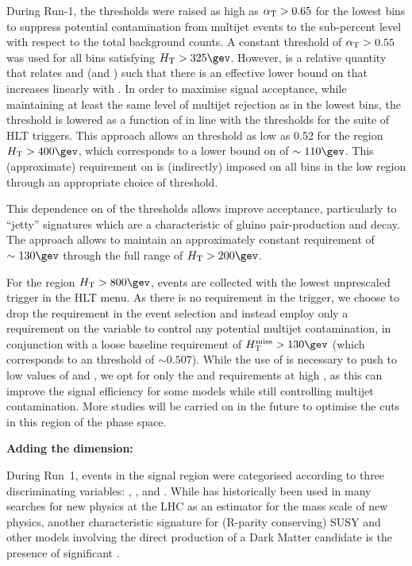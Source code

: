 During Run-1, the \alphat thresholds were raised as high as $\alpha_{\text{T}} >
0.65$ for the lowest \scalht bins to suppress potential contamination
from multijet events to the sub-percent level with respect to the
total background counts. A constant threshold of $\alpha_{\text{T}} > 0.55$ was
used for all bins satisfying $\scalht > 325\gev$. However, \alphat is
a relative quantity that relates \scalht and \mht (and \dht) such that
there is an effective lower bound on \mht that increases linearly with
\scalht. In order to maximise signal acceptance, while maintaining at
least the same level of multijet rejection as in the lowest \scalht
bins, the \alphat threshold is lowered as a function of \scalht
in line with the thresholds for the suite of HLT triggers. This
approach allows an \alphat threshold as low as 0.52 for the
region $\scalht > 400\gev$, which corresponds to a lower bound on \mht
of $\sim110\gev$. This (approximate) requirement on \mht is
(indirectly) imposed on all bins in the low \scalht region through an
appropriate choice of \alphat threshold.

This dependence on \scalht of the \alphat thresholds allows improve acceptance, 
particularly to ``jetty'' signatures which are a
characteristic of gluino pair-production and decay. The approach
allows to maintain an approximately constant \mht requirement of
$\sim130\gev$ through the full range of $\scalht > 200\gev$.

For the region $\scalht > 800\gev$, events are collected with the
lowest unprescaled \scalht trigger in the HLT menu. As there is no
\alphat requirement in the trigger, we choose to drop the \alphat
requirement in the event selection and instead employ only a
requirement on the variable \bdphi to control any potential multijet
contamination, in conjunction with a loose baseline requirement of
$\mht > 130\gev$ (which corresponds to an \alphat threshold of
$\sim0.507$). 
While the use of \alphat is necessary to push to low
values of \scalht and \mht, we opt for only the \bdphi and \mht
requirements at high \scalht, as this can improve the signal
efficiency for some models while still
controlling multijet contamination. 
More studies will be carried on in the future to optimise the cuts in 
this region of the phase space.

{\bf Adding the \mht dimension:}

During Run~1, events in the signal region were categorised according
to three discriminating variables: \scalht, \njet, and \nb. While
\scalht has historically been used in many searches for new physics at
the LHC as an estimator for the mass scale of new physics, another
characteristic signature for (R-parity conserving) SUSY and other
models involving the direct production of a Dark Matter candidate is
the presence of significant \met.

